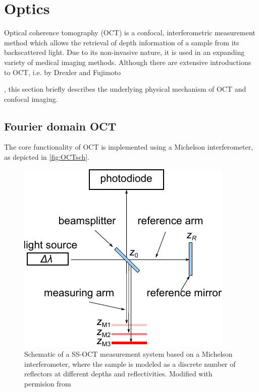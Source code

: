 \section{Optics}
Optical coherence tomography (OCT) is a confocal, interferometric measurement method which allows the retrieval of depth information of a sample from its backscattered light. Due to its non-invasive nature, it is used in an expanding variety of medical imaging methods. Although there are extensive introductions to OCT, i.e. by Drexler and Fujimoto {\cite{Drexler2008}, this section briefly describes the underlying physical mechanism of OCT and confocal imaging.

\subsection{Fourier domain OCT}
The core functionality of OCT is implemented using a Michelson interferometer, as depicted in \autoref{fig:OCTsch}.

\begin{figure}[h!]\centering \includegraphics{figures/20_Theory/Optical/SSOCT-Schema.pdf}
      \caption{Schematic of a SS-OCT measurement system based on a Michelson interferometer, where the sample is modeled as a discrete number of reflectors at different depths and reflectivities. Modified with permision from \cite{Kretschmer}}
      \label{fig:OCTsch}
\end{figure}

}
